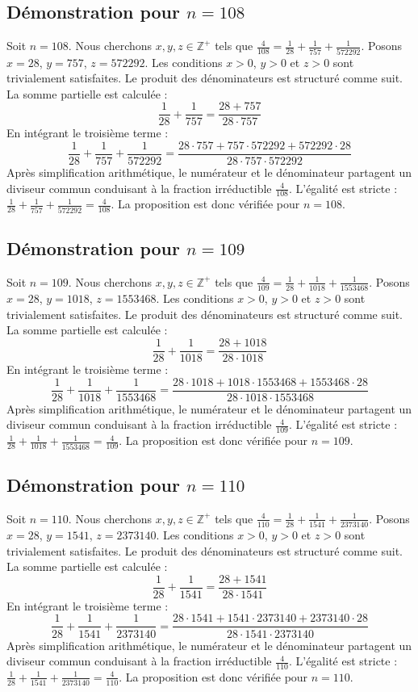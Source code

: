 \documentclass[11pt,a4paper]{article}
\begin{document}
\subsection{Démonstration pour $n = 108$}
Soit $n = 108$. Nous cherchons $x, y, z \in \mathbb{Z}^{+}$ tels que $\frac{4}{108} = \frac{1}{28} + \frac{1}{757} + \frac{1}{572292}$.
Posons $x = 28$, $y = 757$, $z = 572292$.
Les conditions $x > 0$, $y > 0$ et $z > 0$ sont trivialement satisfaites.
Le produit des dénominateurs est structuré comme suit. La somme partielle est calculée :
$$ \frac{1}{28} + \frac{1}{757} = \frac{28+757}{28 \cdot 757} $$
En intégrant le troisième terme :
$$ \frac{1}{28} + \frac{1}{757} + \frac{1}{572292} = \frac{28 \cdot 757 + 757 \cdot 572292 + 572292 \cdot 28}{28 \cdot 757 \cdot 572292} $$
Après simplification arithmétique, le numérateur et le dénominateur partagent un diviseur commun conduisant à la fraction irréductible $\frac{4}{108}$.
L'égalité est stricte : $\frac{1}{28} + \frac{1}{757} + \frac{1}{572292} = \frac{4}{108}$.
La proposition est donc vérifiée pour $n = 108$.
\subsection{Démonstration pour $n = 109$}
Soit $n = 109$. Nous cherchons $x, y, z \in \mathbb{Z}^{+}$ tels que $\frac{4}{109} = \frac{1}{28} + \frac{1}{1018} + \frac{1}{1553468}$.
Posons $x = 28$, $y = 1018$, $z = 1553468$.
Les conditions $x > 0$, $y > 0$ et $z > 0$ sont trivialement satisfaites.
Le produit des dénominateurs est structuré comme suit. La somme partielle est calculée :
$$ \frac{1}{28} + \frac{1}{1018} = \frac{28+1018}{28 \cdot 1018} $$
En intégrant le troisième terme :
$$ \frac{1}{28} + \frac{1}{1018} + \frac{1}{1553468} = \frac{28 \cdot 1018 + 1018 \cdot 1553468 + 1553468 \cdot 28}{28 \cdot 1018 \cdot 1553468} $$
Après simplification arithmétique, le numérateur et le dénominateur partagent un diviseur commun conduisant à la fraction irréductible $\frac{4}{109}$.
L'égalité est stricte : $\frac{1}{28} + \frac{1}{1018} + \frac{1}{1553468} = \frac{4}{109}$.
La proposition est donc vérifiée pour $n = 109$.
\subsection{Démonstration pour $n = 110$}
Soit $n = 110$. Nous cherchons $x, y, z \in \mathbb{Z}^{+}$ tels que $\frac{4}{110} = \frac{1}{28} + \frac{1}{1541} + \frac{1}{2373140}$.
Posons $x = 28$, $y = 1541$, $z = 2373140$.
Les conditions $x > 0$, $y > 0$ et $z > 0$ sont trivialement satisfaites.
Le produit des dénominateurs est structuré comme suit. La somme partielle est calculée :
$$ \frac{1}{28} + \frac{1}{1541} = \frac{28+1541}{28 \cdot 1541} $$
En intégrant le troisième terme :
$$ \frac{1}{28} + \frac{1}{1541} + \frac{1}{2373140} = \frac{28 \cdot 1541 + 1541 \cdot 2373140 + 2373140 \cdot 28}{28 \cdot 1541 \cdot 2373140} $$
Après simplification arithmétique, le numérateur et le dénominateur partagent un diviseur commun conduisant à la fraction irréductible $\frac{4}{110}$.
L'égalité est stricte : $\frac{1}{28} + \frac{1}{1541} + \frac{1}{2373140} = \frac{4}{110}$.
La proposition est donc vérifiée pour $n = 110$.
\end{document}
